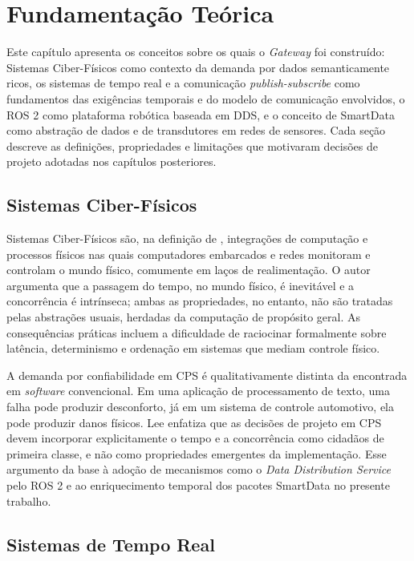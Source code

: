 \documentclass[
    12pt,
    oneside,
    a4paper,
    chapter=TITLE,
    section=TITLE,
    english,
    brazil
]{abntex2}
\begin{document}
\chapter{Fundamentação Teórica}
\label{cap:fundamentacao}

Este capítulo apresenta os conceitos sobre os quais o
\textit{Gateway} foi construído: Sistemas Ciber-Físicos como contexto da
demanda por dados semanticamente ricos, os sistemas de tempo real e a
comunicação \textit{publish-subscribe} como fundamentos das exigências
temporais e do modelo de comunicação envolvidos, o ROS 2 como plataforma robótica
baseada em DDS, e o conceito de SmartData como abstração de dados e de
transdutores em redes de sensores. Cada seção descreve as definições, propriedades e
limitações que motivaram decisões de projeto adotadas nos capítulos
posteriores.

\section{Sistemas Ciber-Físicos}
\label{sec:cps}

Sistemas Ciber-Físicos são, na definição de ,
integrações de computação e processos físicos nas quais computadores
embarcados e redes monitoram e controlam o mundo físico, comumente em
laços de realimentação. O autor argumenta que a passagem do tempo, no mundo
físico, é inevitável e a concorrência é intrínseca; ambas as propriedades,
no entanto, não são tratadas pelas abstrações usuais,
herdadas da computação de propósito geral. As consequências práticas
incluem a dificuldade de raciocinar formalmente sobre latência, determinismo
e ordenação em sistemas que mediam controle físico.

A demanda por confiabilidade em CPS é qualitativamente distinta da
encontrada em \textit{software} convencional. Em uma aplicação de
processamento de texto, uma falha pode produzir desconforto, já em um sistema
de controle automotivo, ela pode produzir danos físicos. Lee enfatiza que
as decisões de projeto em CPS devem incorporar explicitamente o tempo e a
concorrência como cidadãos de primeira classe, e não como propriedades
emergentes da implementação. Esse argumento da base à adoção de mecanismos
como o \textit{Data Distribution Service} pelo ROS 2 e ao enriquecimento
temporal dos pacotes SmartData no presente trabalho.

\section{Sistemas de Tempo Real}
\label{sec:tempo-real}
\end{document}
